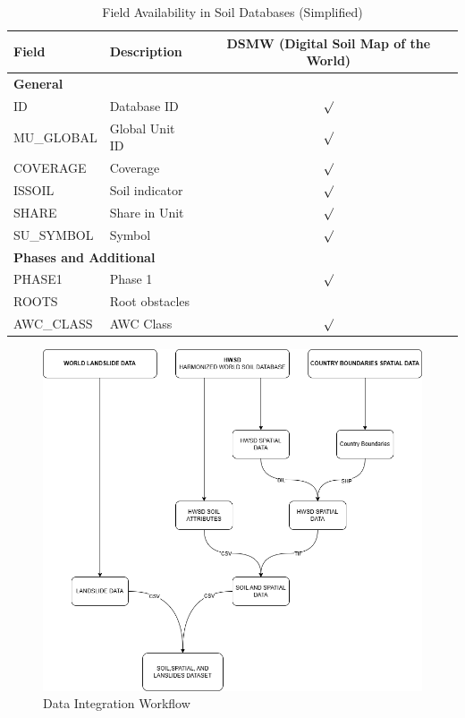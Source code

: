 \begin{table}[H]
\caption{Field Availability in Soil Databases (Simplified)}
\centering
\begin{tabular}{|p{2cm}|p{2.8cm}|c|}
\hline
\textbf{Field} & \textbf{Description} & \textbf{DSMW (Digital Soil Map of the World)} \\
\hline
\multicolumn{3}{|l|}{\textbf{General}} \\
\hline
ID & Database ID & $\surd$ \\
MU\_GLOBAL & Global Unit ID & $\surd$ \\
COVERAGE & Coverage & $\surd$ \\
ISSOIL & Soil indicator & $\surd$ \\
SHARE & Share in Unit & $\surd$ \\
SU\_SYMBOL & Symbol & $\surd$ \\
\hline
\multicolumn{3}{|l|}{\textbf{Phases and Additional}} \\
\hline
PHASE1 & Phase 1 & $\surd$ \\
ROOTS & Root obstacles &  \\
AWC\_CLASS & AWC Class & $\surd$ \\
\hline
\end{tabular}
\label{tab:soil_field_availability_small}
\end{table}

\begin{figure}[htbp]
    \centerline{\includegraphics[width=\linewidth]{fig3.png}}
    \caption{Data Integration Workflow}
    \label{fig:data-integration-workflow}
\end{figure}

